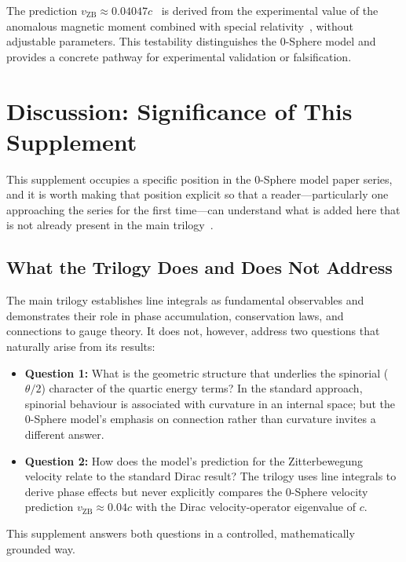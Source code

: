 \documentclass[12pt,letterpaper]{article}
\begin{document}
The prediction $v_{\mathrm{ZB}} \approx 0.04047c$~\cite{hanamura18356895} is derived from the experimental value of the anomalous magnetic moment combined with special relativity~\cite{hanamura17765409}, without adjustable parameters. This testability distinguishes the 0-Sphere model and provides a concrete pathway for experimental validation or falsification.


\section{Discussion: Significance of This Supplement}

\justifying
This supplement occupies a specific position in the 0-Sphere model paper series, and it is worth making that position explicit so that a reader---particularly one approaching the series for the first time---can understand what is added here that is not already present in the main trilogy~\cite{hanamura18067760,hanamura18135855,hanamura18203433}.

\subsection{What the Trilogy Does and Does Not Address}

The main trilogy establishes line integrals as fundamental observables and demonstrates their role in phase accumulation, conservation laws, and connections to gauge theory. It does not, however, address two questions that naturally arise from its results:
\begin{itemize}
\item \textbf{Question 1:} What is the geometric structure that underlies the spinorial ($\theta/2$) character of the quartic energy terms? In the standard approach, spinorial behaviour is associated with curvature in an internal space; but the 0-Sphere model's emphasis on connection rather than curvature invites a different answer.
\item \textbf{Question 2:} How does the model's prediction for the Zitterbewegung velocity relate to the standard Dirac result? The trilogy uses line integrals to derive phase effects but never explicitly compares the 0-Sphere velocity prediction $v_{\mathrm{ZB}} \approx 0.04c$ with the Dirac velocity-operator eigenvalue of $c$.
\end{itemize}
This supplement answers both questions in a controlled, mathematically grounded way.
\end{document}
